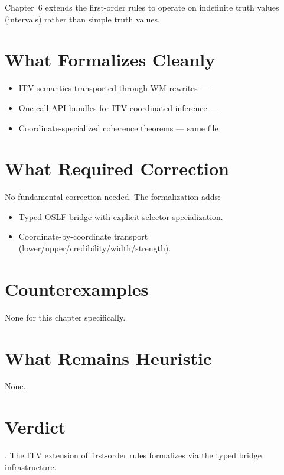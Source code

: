 \documentclass[11pt,openany]{report}
\begin{document}
Chapter~6 extends the first-order rules to operate on indefinite truth
values (intervals) rather than simple truth values.

\section{What Formalizes Cleanly}

\begin{itemize}
\item ITV semantics transported through WM rewrites ---
\item One-call API bundles for ITV-coordinated inference ---
\item Coordinate-specialized coherence theorems ---
  same file
\end{itemize}

\section{What Required Correction}

No fundamental correction needed.  The formalization adds:
\begin{itemize}
\item Typed OSLF bridge with explicit selector specialization.
\item Coordinate-by-coordinate transport
  (lower/upper/credibility/width/strength).
\end{itemize}

\section{Counterexamples}

None for this chapter specifically.

\section{What Remains Heuristic}

None.

\section{Verdict}

\verdictClean{}.  The ITV extension of first-order rules formalizes
via the typed bridge infrastructure.
\end{document}
